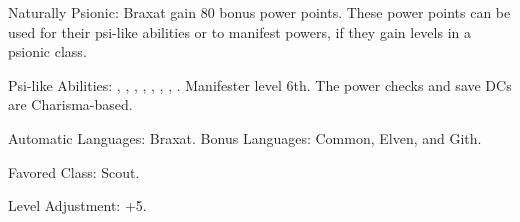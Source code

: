 \begin{itemize*}
    \item Naturally Psionic: Braxat gain 80 bonus power points. These power points can be used for their psi-like abilities or to manifest powers, if they gain levels in a psionic class. %
    \item Psi-like Abilities:
        ,
        ,
        ,
        ,
        ,
        ,
        ,
        .
    Manifester level 6th. The power checks and save DCs are Charisma-based.

    \item Automatic Languages: Braxat. Bonus Languages: Common, Elven, and Gith.
    \item Favored Class: Scout.
    \item Level Adjustment: +5.
\end{itemize*}
